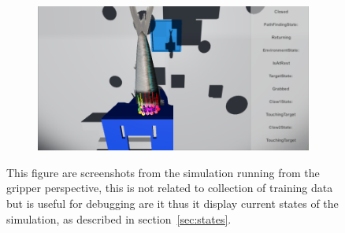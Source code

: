 \begin{figure}
\begin{subfigure}[t]{0.5\textwidth}
\end{subfigure}%
\begin{subfigure}[t]{0.5\textwidth}
\centering
\includegraphics[width=\linewidth]{figures/simulation/returning}
\end{subfigure}
\caption{This figure are screenshots from the simulation running from the gripper perspective, this is not related to collection of training data but is useful for debugging are it thus it display current states of the simulation, as described in section~\ref{sec:states}.}
\end{figure}

